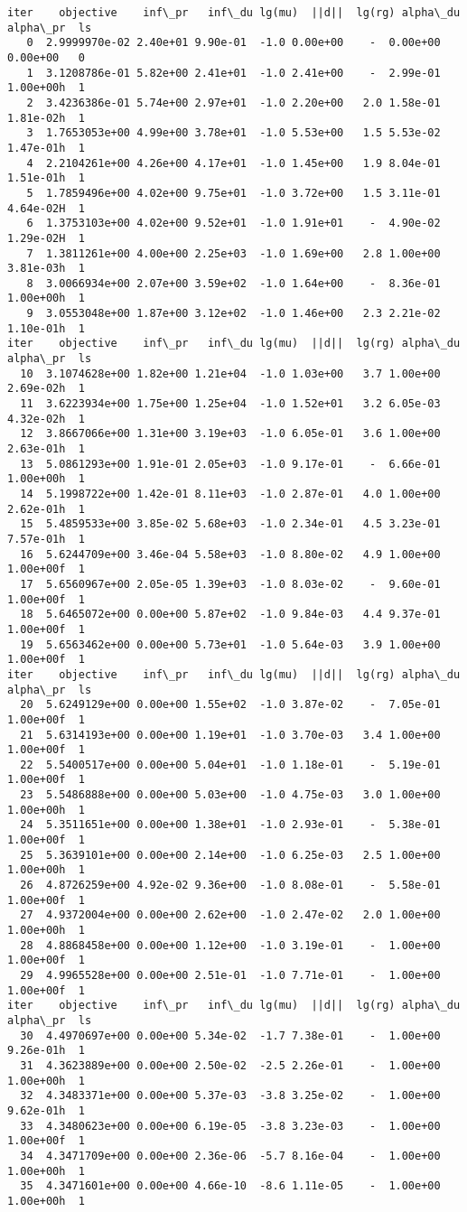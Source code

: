 \begin{Verbatim}[commandchars=\\\{\}]
iter    objective    inf\_pr   inf\_du lg(mu)  ||d||  lg(rg) alpha\_du alpha\_pr  ls
   0  2.9999970e-02 2.40e+01 9.90e-01  -1.0 0.00e+00    -  0.00e+00 0.00e+00   0
   1  3.1208786e-01 5.82e+00 2.41e+01  -1.0 2.41e+00    -  2.99e-01 1.00e+00h  1
   2  3.4236386e-01 5.74e+00 2.97e+01  -1.0 2.20e+00   2.0 1.58e-01 1.81e-02h  1
   3  1.7653053e+00 4.99e+00 3.78e+01  -1.0 5.53e+00   1.5 5.53e-02 1.47e-01h  1
   4  2.2104261e+00 4.26e+00 4.17e+01  -1.0 1.45e+00   1.9 8.04e-01 1.51e-01h  1
   5  1.7859496e+00 4.02e+00 9.75e+01  -1.0 3.72e+00   1.5 3.11e-01 4.64e-02H  1
   6  1.3753103e+00 4.02e+00 9.52e+01  -1.0 1.91e+01    -  4.90e-02 1.29e-02H  1
   7  1.3811261e+00 4.00e+00 2.25e+03  -1.0 1.69e+00   2.8 1.00e+00 3.81e-03h  1
   8  3.0066934e+00 2.07e+00 3.59e+02  -1.0 1.64e+00    -  8.36e-01 1.00e+00h  1
   9  3.0553048e+00 1.87e+00 3.12e+02  -1.0 1.46e+00   2.3 2.21e-02 1.10e-01h  1
iter    objective    inf\_pr   inf\_du lg(mu)  ||d||  lg(rg) alpha\_du alpha\_pr  ls
  10  3.1074628e+00 1.82e+00 1.21e+04  -1.0 1.03e+00   3.7 1.00e+00 2.69e-02h  1
  11  3.6223934e+00 1.75e+00 1.25e+04  -1.0 1.52e+01   3.2 6.05e-03 4.32e-02h  1
  12  3.8667066e+00 1.31e+00 3.19e+03  -1.0 6.05e-01   3.6 1.00e+00 2.63e-01h  1
  13  5.0861293e+00 1.91e-01 2.05e+03  -1.0 9.17e-01    -  6.66e-01 1.00e+00h  1
  14  5.1998722e+00 1.42e-01 8.11e+03  -1.0 2.87e-01   4.0 1.00e+00 2.62e-01h  1
  15  5.4859533e+00 3.85e-02 5.68e+03  -1.0 2.34e-01   4.5 3.23e-01 7.57e-01h  1
  16  5.6244709e+00 3.46e-04 5.58e+03  -1.0 8.80e-02   4.9 1.00e+00 1.00e+00f  1
  17  5.6560967e+00 2.05e-05 1.39e+03  -1.0 8.03e-02    -  9.60e-01 1.00e+00f  1
  18  5.6465072e+00 0.00e+00 5.87e+02  -1.0 9.84e-03   4.4 9.37e-01 1.00e+00f  1
  19  5.6563462e+00 0.00e+00 5.73e+01  -1.0 5.64e-03   3.9 1.00e+00 1.00e+00f  1
iter    objective    inf\_pr   inf\_du lg(mu)  ||d||  lg(rg) alpha\_du alpha\_pr  ls
  20  5.6249129e+00 0.00e+00 1.55e+02  -1.0 3.87e-02    -  7.05e-01 1.00e+00f  1
  21  5.6314193e+00 0.00e+00 1.19e+01  -1.0 3.70e-03   3.4 1.00e+00 1.00e+00f  1
  22  5.5400517e+00 0.00e+00 5.04e+01  -1.0 1.18e-01    -  5.19e-01 1.00e+00f  1
  23  5.5486888e+00 0.00e+00 5.03e+00  -1.0 4.75e-03   3.0 1.00e+00 1.00e+00h  1
  24  5.3511651e+00 0.00e+00 1.38e+01  -1.0 2.93e-01    -  5.38e-01 1.00e+00f  1
  25  5.3639101e+00 0.00e+00 2.14e+00  -1.0 6.25e-03   2.5 1.00e+00 1.00e+00h  1
  26  4.8726259e+00 4.92e-02 9.36e+00  -1.0 8.08e-01    -  5.58e-01 1.00e+00f  1
  27  4.9372004e+00 0.00e+00 2.62e+00  -1.0 2.47e-02   2.0 1.00e+00 1.00e+00h  1
  28  4.8868458e+00 0.00e+00 1.12e+00  -1.0 3.19e-01    -  1.00e+00 1.00e+00f  1
  29  4.9965528e+00 0.00e+00 2.51e-01  -1.0 7.71e-01    -  1.00e+00 1.00e+00f  1
iter    objective    inf\_pr   inf\_du lg(mu)  ||d||  lg(rg) alpha\_du alpha\_pr  ls
  30  4.4970697e+00 0.00e+00 5.34e-02  -1.7 7.38e-01    -  1.00e+00 9.26e-01h  1
  31  4.3623889e+00 0.00e+00 2.50e-02  -2.5 2.26e-01    -  1.00e+00 1.00e+00h  1
  32  4.3483371e+00 0.00e+00 5.37e-03  -3.8 3.25e-02    -  1.00e+00 9.62e-01h  1
  33  4.3480623e+00 0.00e+00 6.19e-05  -3.8 3.23e-03    -  1.00e+00 1.00e+00f  1
  34  4.3471709e+00 0.00e+00 2.36e-06  -5.7 8.16e-04    -  1.00e+00 1.00e+00h  1
  35  4.3471601e+00 0.00e+00 4.66e-10  -8.6 1.11e-05    -  1.00e+00 1.00e+00h  1


\end{Verbatim}
